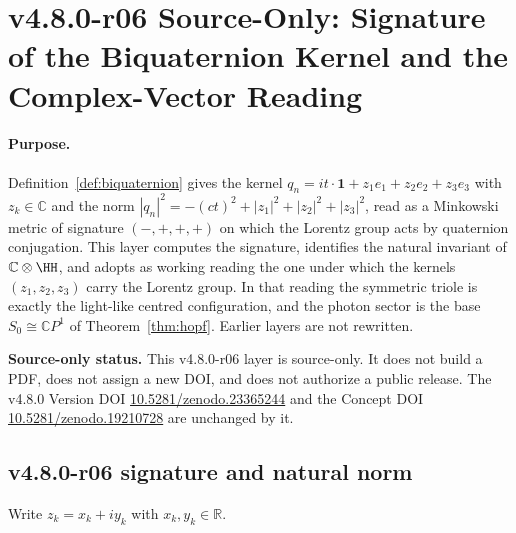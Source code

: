 
\clearpage
\section*{v4.8.0-r06 Source-Only: Signature of the Biquaternion Kernel and the Complex-Vector Reading}
\label{sec:v480-r06-complex-vector-reading}

\paragraph{Purpose.}
Definition~\ref{def:biquaternion} gives the kernel
\(q_n=it\cdot\mathbf 1+z_1e_1+z_2e_2+z_3e_3\) with \(z_k\in\mathbb C\) and the norm
\(|q_n|^2=-(ct)^2+|z_1|^2+|z_2|^2+|z_3|^2\), read as a Minkowski metric of signature
\((-,+,+,+)\) on which the Lorentz group acts by quaternion conjugation.  This layer computes
the signature, identifies the natural invariant of \(\mathbb C\otimes\HH\), and adopts as working
reading the one under which the kernels \((z_1,z_2,z_3)\) carry the Lorentz group.  In that reading
the symmetric triole is exactly the light-like centred configuration, and the photon sector is the
base \(S_0\cong\mathbb CP^1\) of Theorem~\ref{thm:hopf}.  Earlier layers are not rewritten.

\noindent\textbf{Source-only status.}
This v4.8.0-r06 layer is source-only.  It does not build a PDF, does not assign a new DOI,
and does not authorize a public release.  The v4.8.0 Version DOI
\href{https://doi.org/10.5281/zenodo.23365244}{10.5281/zenodo.23365244} and the Concept DOI
\href{https://doi.org/10.5281/zenodo.19210728}{10.5281/zenodo.19210728} are unchanged by it.

\subsection*{v4.8.0-r06 signature and natural norm}
\label{subsec:v480-r06-signature}

Write \(z_k=x_k+iy_k\) with \(x_k,y_k\in\mathbb R\).

